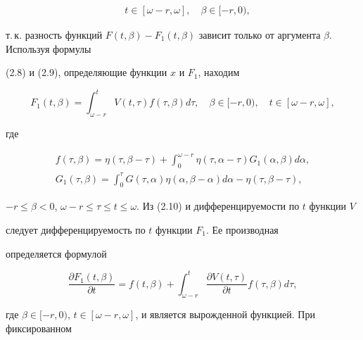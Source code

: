 \begin{pf}
\begin{multline}
\quad t \in[\omega-r, \omega], \quad \beta \in[-r,0),


\end{multline}


т.\,к. разность функций $F(t, \beta)-F_{1}(t,


\beta)$ зависит только от аргумента $\beta$. Используя формулы


(2.8) и (2.9), определяющие функции $x$ и $F_{1}$, находим


\begin{equation}


F_{1}(t, \beta) = \int_{\omega-r}^{t}V(t, \tau) f(\tau, \beta) d


\tau,  \quad \beta \in[-r,0), \quad t \in[\omega-r, \omega],


\end{equation}


где


\begin{gather}


f(\tau, \beta) = \eta(\tau, \beta- \tau)+


\int_{0}^{\omega-r} \eta(\tau, \alpha- \tau) G_{1}(\alpha, \beta)


d \alpha, \\


G_{1}(\tau, \beta) =


\int_{0}^{\tau}G(\tau, \alpha)


\eta(\alpha, \beta- \alpha) d \alpha- \eta(\tau, \beta- \tau),


\end{gather}


$-r \leq \beta<0$, $\omega-r \leq \tau \leq t


\leq \omega$. Из (2.10) и дифференцируемости по $t$ функции $V$


следует дифференцируемость по $t$ функции $F_{1}$. Ее производная


определяется формулой


\begin{equation}


\frac{\partial F_{1}(t, \beta)


}{\partial t} =f( t, \beta) + \int_{\omega-r}^{t} \frac{\partial


V( t, \tau) }{\partial t} f(\tau, \beta) d \tau,


\end{equation}


где $ \beta \in[-r,0)$, $t \in[\omega-r,


\omega]$, и является вырожденной функцией. При фиксированном



\end{pf}
